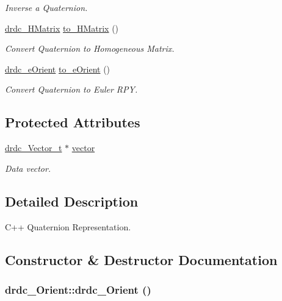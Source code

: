 \begin{CompactItemize}
\begin{CompactList}\small\item\em Inverse a Quaternion. \item\end{CompactList}\item 
\hyperlink{classdrdc__HMatrix}{drdc\_\-HMatrix} \hyperlink{classdrdc__Orient_1ada30d0a48a4c563c6b8d97c40446ac}{to\_\-HMatrix} ()
\begin{CompactList}\small\item\em Convert Quaternion to Homogeneous Matrix. \item\end{CompactList}\item 
\hyperlink{classdrdc__eOrient}{drdc\_\-eOrient} \hyperlink{classdrdc__Orient_408dbcbc5a32fd60251e5870929d2b90}{to\_\-eOrient} ()
\begin{CompactList}\small\item\em Convert Quaternion to Euler RPY. \item\end{CompactList}\end{CompactItemize}
\subsection*{Protected Attributes}
\begin{CompactItemize}
\item 
\hyperlink{structdrdc__Vector__t}{drdc\_\-Vector\_\-t} $\ast$ \hyperlink{classdrdc__Orient_c49c0144ecfa31793c1bd5134ced5c34}{vector}
\begin{CompactList}\small\item\em Data vector. \item\end{CompactList}\end{CompactItemize}


\subsection{Detailed Description}
C++ Quaternion Representation. 



\subsection{Constructor \& Destructor Documentation}
\hypertarget{classdrdc__Orient_f89888fb11efcf890f1e99d413c242f8}{
\subsubsection[drdc\_\-Orient]{\setlength{\rightskip}{0pt plus 5cm}drdc\_\-Orient::drdc\_\-Orient ()}}
\label{classdrdc__Orient_f89888fb11efcf890f1e99d413c242f8}


